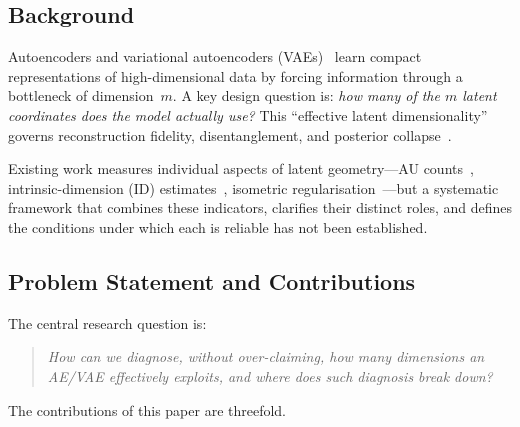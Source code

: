 \documentclass[11pt,a4paper]{article}
\begin{document}
\subsection{Background}\label{sec:intro_bg}

Autoencoders and variational autoencoders (VAEs)~\cite{kingma2014vae} learn
compact representations of high-dimensional data by forcing information through
a bottleneck of dimension~$m$.  A key design question is: \emph{how many of
the $m$ latent coordinates does the model actually use?}  This ``effective
latent dimensionality'' governs reconstruction fidelity, disentanglement, and
posterior collapse~\cite{lucas2019elbo}.

Existing work measures individual aspects of latent geometry—AU
counts~\cite{lucas2019elbo,higgins2017betavae}, intrinsic-dimension (ID)
estimates~\cite{facco2017twonn,levina2005mle}, isometric
regularisation~\cite{kato2020rdae}—but a systematic framework that combines
these indicators, clarifies their distinct roles, and defines the conditions
under which each is reliable has not been established.

\subsection{Problem Statement and Contributions}\label{sec:intro_aim}

The central research question is:
\begin{quote}
\emph{How can we diagnose, without over-claiming, how many dimensions an AE/VAE
effectively exploits, and where does such diagnosis break down?}
\end{quote}

The contributions of this paper are threefold.
\end{document}
